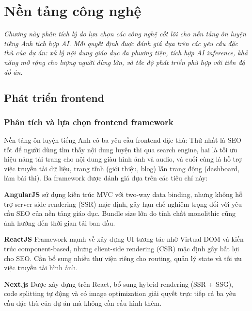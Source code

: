 \chapter{Nền tảng công nghệ}
\textit{Chương này phân tích lý do lựa chọn các công nghệ cốt lõi cho nền tảng ôn luyện tiếng Anh tích hợp AI. Mỗi quyết định được đánh giá dựa trên các yêu cầu đặc thù của dự án: xử lý nội dung giáo dục đa phương tiện, tích hợp AI inference, khả năng mở rộng cho lượng người dùng lớn, và tốc độ phát triển phù hợp với tiến độ đồ án.}

\section{Phát triển frontend}

\subsection{Phân tích và lựa chọn frontend framework}

Nền tảng ôn luyện tiếng Anh có ba yêu cầu frontend đặc thù: Thứ nhất là SEO tốt để người dùng tìm thấy nội dung luyện thi qua search engine, hai là tối ưu hiệu năng tải trang cho nội dung giàu hình ảnh và audio, và cuối cùng là hỗ trợ việc truyền tải dữ liệu, trang tĩnh (giới thiệu, blog) lẫn trang động (dashboard, làm bài thi). Ba framework được đánh giá dựa trên các tiêu chí này:

\textbf{AngularJS} sử dụng kiến trúc MVC với two-way data binding, nhưng không hỗ trợ server-side rendering (SSR) mặc định, gây hạn chế nghiêm trọng đối với yêu cầu SEO của nền tảng giáo dục. Bundle size lớn do tính chất monolithic cũng ảnh hưởng đến thời gian tải ban đầu. \cite{angularjs}

\textbf{ReactJS} Framework mạnh về xây dựng UI tương tác nhờ Virtual DOM và kiến trúc component-based, nhưng client-side rendering (CSR) mặc định gây bất lợi cho SEO. Cần bổ sung nhiều thư viện riêng cho routing, quản lý state và tối ưu việc truyền tải hình ảnh. \cite{angular_react}

\textbf{Next.js} Được xây dựng trên React, bổ sung hybrid rendering (SSR + SSG), code splitting tự động và có image optimization giải quyết trực tiếp cả ba yêu cầu đặc thù của dự án mà không cần cấu hình thêm. \cite{next_react_angular}


